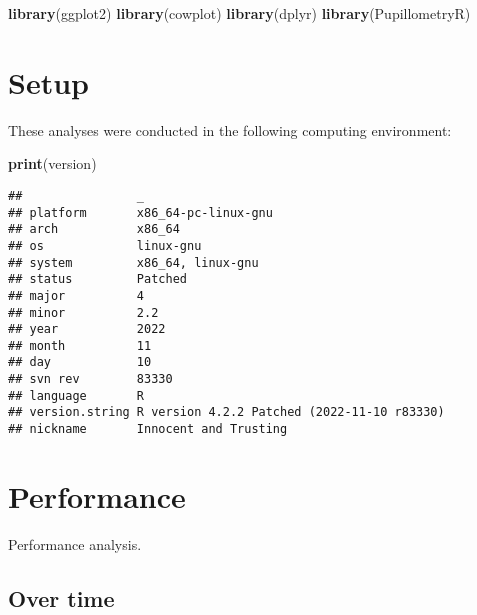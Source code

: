 \documentclass[]{book}
\newenvironment{Shaded}{\begin{snugshade}}{\end{snugshade}}
\newcommand{\KeywordTok}[1]{\textcolor[rgb]{0.13,0.29,0.53}{\textbf{#1}}}
\newcommand{\NormalTok}[1]{#1}
\begin{document}
\begin{Shaded}
\begin{Highlighting}[]
\KeywordTok{library}\NormalTok{(ggplot2)}
\KeywordTok{library}\NormalTok{(cowplot)}
\KeywordTok{library}\NormalTok{(dplyr)}
\KeywordTok{library}\NormalTok{(PupillometryR)}
\end{Highlighting}
\end{Shaded}

\hypertarget{setup-3}{%
\section{Setup}\label{setup-3}}

These analyses were conducted in the following computing environment:

\begin{Shaded}
\begin{Highlighting}[]
\KeywordTok{print}\NormalTok{(version)}
\end{Highlighting}
\end{Shaded}

\begin{verbatim}
##                _                                          
## platform       x86_64-pc-linux-gnu                        
## arch           x86_64                                     
## os             linux-gnu                                  
## system         x86_64, linux-gnu                          
## status         Patched                                    
## major          4                                          
## minor          2.2                                        
## year           2022                                       
## month          11                                         
## day            10                                         
## svn rev        83330                                      
## language       R                                          
## version.string R version 4.2.2 Patched (2022-11-10 r83330)
## nickname       Innocent and Trusting
\end{verbatim}

\hypertarget{performance}{%
\section{Performance}\label{performance}}

Performance analysis.

\hypertarget{over-time-1}{%
\subsection{Over time}\label{over-time-1}}
\end{document}
